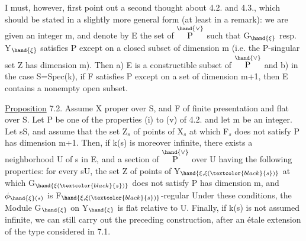 
I must, however, first point out a second thought about 4.2. and 4.3., which
should be stated in a slightly more general form (at least
in a remark): we are given an integer m, and denote by E the
set of \hand{$\xi\in$}$\overset{\hand{\vee}}{\text{P}}$ such that G$_{\hand{\xi}}$ resp. Y$_{\hand{\xi}}$ satisfies P except  on a
closed subset of dimension \hand{$\leq$}m (i.e. the P-singular set Z has dimension
\hand{$\leq$} m). Then a) E is a constructible subset of $\overset{\hand{\vee}}{\text{P}}$ and b) in the
case S=Spec(k), if F  satisfies P except  on a set of
dimension \hand{$\leq$} m+1, then E contains a nonempty open subset.

\uline{Proposition} 7.2. Assume X proper over S, and F of finite
presentation and flat over S. Let P be one of the properties (i) to (v) of 4.2.
and let m be an integer. Let s\hand{$\in$}S, and assume that 
 the set Z$_s$ of points of X$_s$ at which F$_s$ does not satisfy
P has dimension \hand{$\leq$} m+1. Then, if k(s) is moreover infinite, there
exists a neighborhood U of s in E, and a section \hand{$\xi$} of $\overset{\hand{\vee}}{\text{P}}$ over U having
the following properties: for every s\hand{$\in$}U, the set Z of points
of  Y$_{\hand{\xi,\xi(\textcolor{black}{s})}}$ at which G$_{\hand{\xi(\textcolor{black}{s})}}$ does not satisfy P has dimension
\hand{$\leq$}m, and $\phi_{\hand{\xi}(s)}$ is F$_{\hand{\xi,\xi(\textcolor{black}{s})}}$-regular\hand{,}  Under these
conditions, the Module G$_{\hand{\xi}}$ on Y$_{\hand{\xi}}$ is flat relative to U. Finally, if k(s)
is not assumed infinite, we can still carry out the preceding
construction, after an étale extension of the type considered in 7.1.


